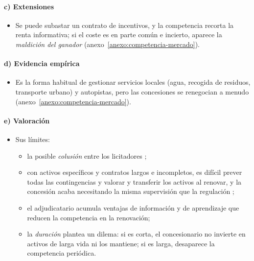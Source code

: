 \documentclass[11pt]{article}
\begin{document}
\paragraph{c) Extensiones}

\begin{itemize}
\item Se puede subastar un contrato de incentivos, y la competencia recorta la renta informativa\nocite{LaffontTirole1987Auctioning}; si el coste es en parte común e incierto, aparece la \emph{maldición del ganador}  (anexo~\ref{anexo:competencia-mercado}).
\end{itemize}

\paragraph{d) Evidencia empírica}

\begin{itemize}
\item Es la forma habitual de gestionar servicios locales (agua, recogida de residuos, transporte urbano) y autopistas, pero las concesiones se renegocian a menudo\nocite{GuaschLaffontStraub2008Renegotiation} (anexo~\ref{anexo:competencia-mercado}).
\end{itemize}

\paragraph{e) Valoración}

\begin{itemize}
\item Sus límites\nocite{Williamson1976Franchise}:
  \begin{itemize}
  \item la posible \emph{colusión} entre los licitadores ;
  \item con activos específicos y contratos largos e incompletos, es difícil prever todas las contingencias y valorar y transferir los activos al renovar, y la concesión acaba necesitando la misma supervisión que la regulación ;
  \item el adjudicatario acumula ventajas de información y de aprendizaje que reducen la competencia en la renovación;
  \item la \emph{duración} plantea un dilema: si es corta, el concesionario no invierte en activos de larga vida ni los mantiene; si es larga, desaparece la competencia periódica.
  \end{itemize}
\end{itemize}
\end{document}
